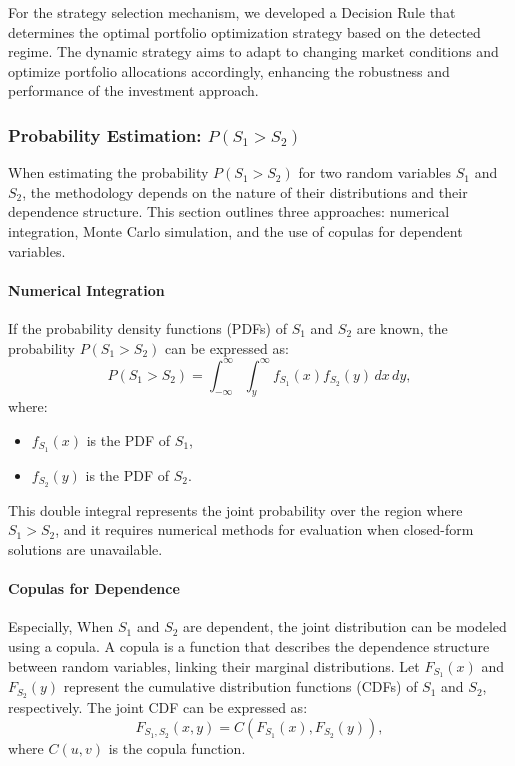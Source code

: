 For the strategy selection mechanism, we developed a Decision Rule that determines the optimal portfolio optimization strategy based on the detected regime. The dynamic strategy aims to adapt to changing market conditions and optimize portfolio allocations accordingly, enhancing the robustness and performance of the investment approach.
\subsubsection{Probability Estimation: $P(S_1 > S_2)$}

When estimating the probability $P(S_1 > S_2)$ for two random variables $S_1$ and $S_2$, the methodology depends on the nature of their distributions and their dependence structure. This section outlines three approaches: numerical integration, Monte Carlo simulation, and the use of copulas for dependent variables.

\paragraph{Numerical Integration}

If the probability density functions (PDFs) of $S_1$ and $S_2$ are known, the probability $P(S_1 > S_2)$ can be expressed as:
\begin{equation}
P(S_1 > S_2) = \int_{-\infty}^\infty \int_{y}^\infty f_{S_1}(x) f_{S_2}(y) \, dx \, dy,
\end{equation}
where:
\begin{itemize}
    \item $f_{S_1}(x)$ is the PDF of $S_1$,
    \item $f_{S_2}(y)$ is the PDF of $S_2$.
\end{itemize}

This double integral represents the joint probability over the region where $S_1 > S_2$, and it requires numerical methods for evaluation when closed-form solutions are unavailable.


\paragraph{Copulas for Dependence}

Especially, When $S_1$ and $S_2$ are dependent, the joint distribution can be modeled using a copula. A copula is a function that describes the dependence structure between random variables, linking their marginal distributions. Let $F_{S_1}(x)$ and $F_{S_2}(y)$ represent the cumulative distribution functions (CDFs) of $S_1$ and $S_2$, respectively. The joint CDF can be expressed as:
\begin{equation}
F_{S_1, S_2}(x, y) = C(F_{S_1}(x), F_{S_2}(y)),
\end{equation}
where $C(u, v)$ is the copula function.

